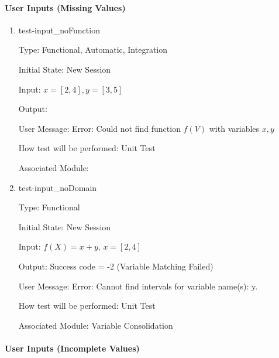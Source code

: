 \documentclass[12pt, titlepage]{article}
\begin{document}
\paragraph{User Inputs (Missing Values)}

\begin{enumerate}

	\item{test-input\_noFunction}
	
	Type: Functional, Automatic, Integration
	
	Initial State: New Session
	
	Input: $x = [2,4], y = [3,5]$
	
	Output: 
	
	User Message: Error: Could not find function $f(V)$ with variables $x, y$
	
	How test will be performed: Unit Test
	
	Associated Module: \\
	
	\item{test-input\_noDomain}
		
	Type: Functional
		
	Initial State: New Session
		
	Input: $f(X) = x + y$, $x = [2,4]$
		
	Output:	Success code = -2 (Variable Matching Failed)
	
	User Message: Error: Cannot find intervals for variable name(s): y.
		
	How test will be performed: Unit Test
	
	Associated Module: Variable Consolidation\\

\end{enumerate}

\paragraph{User Inputs (Incomplete Values)}
\end{document}
